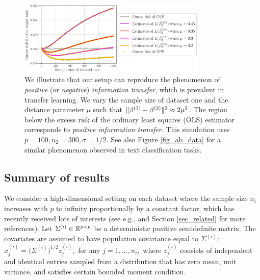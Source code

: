 \begin{figure}
    \centering
    \includegraphics[width=0.8\textwidth]{figures/motivation.eps}
    \caption{We illustrate that our setup can reproduce the phenomenon of \textit{positive} (or \textit{negative}) \textit{information transfer}, which is prevalent in transfer learning.
    We vary the sample size of dataset one and the distance parameter $\mu$ such that $\|\beta^{(1)} - \beta^{(2)}\|^2 \approx 2\mu^2$. The region below the excess risk of the ordinary least squares (OLS) estimator corresponds to \textit{positive information transfer}. This simulation uses $p = 100, n_2 = 300, \sigma = 1/2$. See also Figure \ref{fig_ab_data} for a similar phenomenon observed in text classification tasks.}
    \label{fig_motivation}
\end{figure}

\subsection{Summary of results}

We consider a high-dimensional setting on each dataset where the sample size $n_i$ increases with $p$ to infinity proportionally by a constant factor, which has recently received lots of interests (see e.g., \citet{hastie2019surprises} and Section \ref{sec_related} for more references).
Let $\Sigma^{(i)} \in \mathbb{R}^{p\times p}$ be a deterministic positive semidefinite matrix.
The covariates are assumed to have population covariance equal to $\Sigma^{(i)}$: $x_j^{(i)} = \big(\Sigma^{(i)}\big)^{1/2} z_{j}^{(i)},$ for any $j = 1,\dots,n_i,$
where $z_j^{(i)}$ consists of independent and identical entries sampled from a distribution that has zero mean, unit variance, and satisfies certain bounded moment condition.

